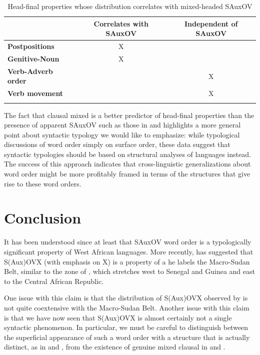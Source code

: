 \documentclass[output=paper]{LSP/langsci}
\begin{document}
\begin{table}
\begin{tabular}{lcc}
\lsptoprule
& \textbf{Correlates with SAuxOV} & \textbf{Independent of SAuxOV}\\
\midrule
\textbf{Postpositions} & X & \\
\textbf{Genitive-Noun} & X & \\
\textbf{Verb-Adverb order} & & X\\
\textbf{Verb movement} & & X\\	
\lspbottomrule
\end{tabular}
    \caption{Head-final properties whose distribution correlates with mixed-headed SAuxOV}\label{tab:sande:wosummary}
\end{table}

The fact that clausal mixed  is a better predictor of head-final properties than the presence of apparent SAuxOV such as those in  and  highlights a more general point about syntactic typology we would like to emphasize: while typological discussions of word order  simply on surface order, these data suggest that syntactic typologies should be based on structural analyses of languages instead. The success of this approach indicates that cross-linguistic generalizations about word order might be more profitably framed in terms of the structures that give rise to these word orders.

\section{Conclusion}
It has been understood since at least \citet{heine76} that SAuxOV word order is a typologically significant property of West African languages. More recently, \citet{guld08,guld11} has suggested that S(Aux)OVX (with emphasis on X) is a property of a  he labels the Macro-Sudan Belt, similar to the  zone of \citet{clements08}, which stretches west to Senegal and Guinea and east to the Central African Republic.  

One issue with this claim is that the distribution of S(Aux)OVX observed by \citet{guld08} is not quite coextensive with the Macro-Sudan Belt. Another issue with this claim is that we have now seen that S(Aux)OVX is almost certainly not a single syntactic phenomenon. In particular, we must be careful to distinguish between the superficial appearance of such a word order with a structure that is actually distinct, as in  and , from the existence of genuine mixed clausal  in  and .
\end{document}
